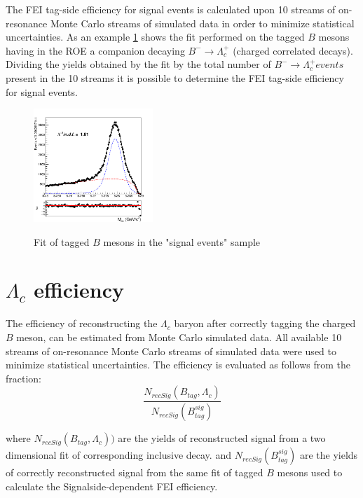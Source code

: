  The FEI tag-side efficiency for signal events is calculated upon 10 streams of on-resonance Monte Carlo streams of simulated data 
 in order to minimize statistical uncertainties.
 As an example \cref{fig:10streams_chargedBtag_corrLambdaC_TotalSignalBtag_fit} shows the fit performed on the tagged $B$ mesons having in the ROE a companion decaying $B^- \rightarrow \Lambda_c^+$ (charged correlated decays). 
 Dividing the yields obtained by the fit by the total number of $B^- \rightarrow \Lambda_c^+ events$ present in the 10 streams it is possible to determine the FEI tag-side efficiency for signal events.
 \begin{figure}[H]
    \centering
    {\includegraphics[width=0.40\textwidth]{06-Efficiencies/figs/10streams_chargedBtag_corrLambdaC_TotalSignalBtag_fit.png}}
    \caption{Fit of tagged $B$ mesons in the "signal events" sample}
    \label{fig:10streams_chargedBtag_corrLambdaC_TotalSignalBtag_fit}
    \end{figure}
\section{$\Lambda_c$ efficiency}
The efficiency of reconstructing the ${\Lambda_c}$ baryon after correctly tagging the charged $B$ meson, can be estimated from Monte Carlo simulated data.
All available 10 streams of on-resonance Monte Carlo streams of simulated data were used to minimize statistical uncertainties.
The efficiency is evaluated as follows from the fraction:  
\begin{equation}
    \frac{N_{recSig}(B_{tag}, \Lambda_c)}{N_{recSig}(B_{tag}^{sig})}
\end{equation}

\vspace{0.5cm}

\noindent where $N_{recSig}(B_{tag}, \Lambda_c))$ are the yields of reconstructed signal from a two dimensional fit of corresponding inclusive decay.
 and  $N_{recSig}(B_{tag}^{sig})$ are the yields of correctly reconstructed signal from the same fit of tagged $B$ mesons used to calculate the Signalside-dependent FEI efficiency. 


